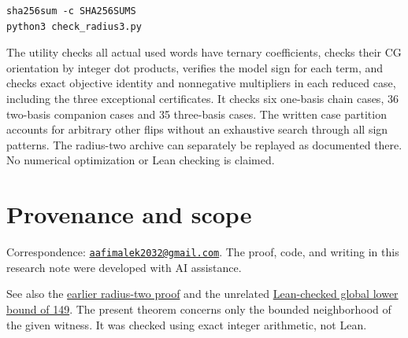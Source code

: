\documentclass[
  11pt,
]{article}
\begin{document}
\begin{verbatim}
sha256sum -c SHA256SUMS
python3 check_radius3.py
\end{verbatim}

The utility checks all actual used words have ternary coefficients,
checks their CG orientation by integer dot products, verifies the model
sign for each term, and checks exact objective identity and nonnegative
multipliers in each reduced case, including the three exceptional
certificates. It checks six one-basis chain cases, 36 two-basis
companion cases and 35 three-basis cases. The written case partition
accounts for arbitrary other flips without an exhaustive search through
all sign patterns. The radius-two archive can separately be replayed as
documented there. No numerical optimization or Lean checking is claimed.

\section{Provenance and scope}\label{provenance-and-scope}

Correspondence:
\href{mailto:aafimalek2032@gmail.com}{\nolinkurl{aafimalek2032@gmail.com}}.
The proof, code, and writing in this research note were developed with
AI assistance.

See also the
\href{https://github.com/Aafimalek/novel-discoveries/tree/cfe880a69f3cf904c1c49dc531ecb18b28770964/nine-separated-subset-sums/verification/conway-guy-chambers-radius-two}{earlier
radius-two proof} and the unrelated
\href{https://github.com/Aafimalek/novel-discoveries/tree/76beffd491584923083c1c3d8f2abe637dde12a3/nine-separated-subset-sums/verification/lean-real-149}{Lean-checked
global lower bound of 149}. The present theorem concerns only the
bounded neighborhood of the given witness. It was checked using exact
integer arithmetic, not Lean.
\end{document}
